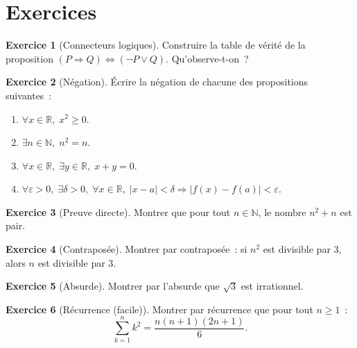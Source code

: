 \documentclass[12pt,a4paper,openany]{book}
\theoremstyle{definition}
\newtheorem{exercice}{Exercice}[chapter]
\newcommand{\N}{\mathbb{N}}
\newcommand{\R}{\mathbb{R}}
\newcommand{\eps}{\varepsilon}
\newcommand{\abs}[1]{\left\lvert #1 \right\rvert}
\begin{document}
\section*{Exercices}

\begin{exercice}[Connecteurs logiques]\label{exo:exo-connecteurs}
  Construire la table de vérité de la proposition $(P \Rightarrow Q) \Leftrightarrow (\lnot P \lor Q)$. Qu'observe-t-on~?
\end{exercice}

\begin{exercice}[Négation]\label{exo:exo-negation1}
  Écrire la négation de chacune des propositions suivantes~:
  \begin{enumerate}[label=(\alph*)]
    \item $\forall x \in \R,\; x^2 \geq 0$.
    \item $\exists n \in \N,\; n^2 = n$.
    \item $\forall x \in \R,\; \exists y \in \R,\; x + y = 0$.
    \item $\forall \eps > 0,\; \exists \delta > 0,\; \forall x \in \R,\; \abs{x - a} < \delta \Rightarrow \abs{f(x) - f(a)} < \eps$.
  \end{enumerate}
\end{exercice}

\begin{exercice}[Preuve directe]\label{exo:exo-directe}
  Montrer que pour tout $n \in \N$, le nombre $n^2 + n$ est pair.
\end{exercice}

\begin{exercice}[Contraposée]\label{exo:exo-contra1}
  Montrer par contraposée~: si $n^2$ est divisible par $3$, alors $n$ est divisible par $3$.
\end{exercice}

\begin{exercice}[Absurde]\label{exo:exo-absurde1}
  Montrer par l'absurde que $\sqrt{3}$ est irrationnel.
\end{exercice}

\begin{exercice}[Récurrence (facile)]\label{exo:exo-recurrence1}
  Montrer par récurrence que pour tout $n \geq 1$~:
  \[
    \sum_{k=1}^{n} k^2 = \frac{n(n+1)(2n+1)}{6}.
  \]
\end{exercice}
\end{document}
